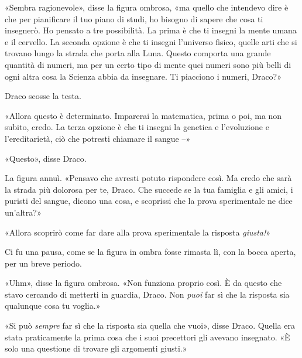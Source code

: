 «Sembra ragionevole», disse la figura ombrosa, «ma quello che intendevo dire è che per pianificare il tuo piano di studi, ho bisogno di sapere che cosa ti insegnerò. Ho pensato a tre possibilità. La prima è che ti insegni la mente umana e il cervello. La seconda opzione è che ti insegni l’universo fisico, quelle arti che si trovano lungo la strada che porta alla Luna. Questo comporta una grande quantità di numeri, ma per un certo tipo di mente quei numeri sono più belli di ogni altra cosa la Scienza abbia da insegnare. Ti piacciono i numeri, Draco?»

Draco scosse la testa.

«Allora questo è determinato. Imparerai la matematica, prima o poi, ma non subito, credo. La terza opzione è che ti insegni la genetica e l’evoluzione e l’ereditarietà, ciò che potresti chiamare il sangue –»

«Questo», disse Draco.

La figura annuì. «Pensavo che avresti potuto rispondere così. Ma credo che sarà la strada più dolorosa per te, Draco. Che succede se la tua famiglia e gli amici, i puristi del sangue, dicono una cosa, e scoprissi che la prova sperimentale ne dice un’altra?»

«Allora scoprirò come far dare alla prova sperimentale la risposta \textit{giusta!}»

Ci fu una pausa, come se la figura in ombra fosse rimasta lì, con la bocca aperta, per un breve periodo.

«Uhm», disse la figura ombrosa. «Non funziona proprio così. È da questo che stavo cercando di metterti in guardia, Draco. Non \textit{puoi} far sì che la risposta sia qualunque cosa tu voglia.»

«Si può \textit{sempre} far sì che la risposta sia quella che vuoi», disse Draco. Quella era stata praticamente la prima cosa che i suoi precettori gli avevano insegnato. «È solo una questione di trovare gli argomenti giusti.»

